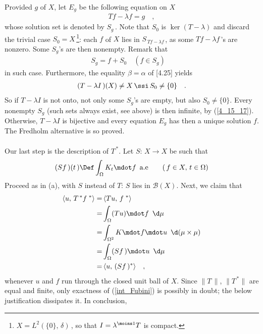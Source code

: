 \\
Provided  $g$ of $X$, let $E_g$ be the following equation on $X$
\begin{align}Tf-\lambda f =g \quad ,\end{align}
whose solution set is denoted by $S_g\,$. Note that $S_0$ is $\ker (T-\lambda)$ and discard the trivial case $S_0=X\,$\footnote{\eg$ X=L^2(\{0\},\, \delta)\,$, so that $I=\lambda^{\moins 1} T $ is compact. }: each $f$ of $X $ lies in $S_{\,Tf-\lambda f\,} $, as some $Tf-\lambda f\,$'s are nonzero. Some $S_g$'s are then nonempty. Remark that 
\begin{align}\label{4_15_17}
S_g= f + S_0 \quad (f\in S_g) \quad 
\end{align}
in such case. Furthermore, the equality $\beta= \alpha $ of [4.25] yields 
\begin{align}
(T-\lambda I\,)(X)\neq X \, \ssi\, S_0 \neq\{0\}  \quad .
\end{align}
So if $T-\lambda I$ is not onto, not only some $S_g$'s are empty, but also $S_0\neq\{0\}$. Every nonempty $S_g$ (such sets always exist, see above) is then infinite, by (\ref{4_15_17}).\\
Otherwise, $T-\lambda I$ is bijective and every equation $E_g$ has then a unique solution $f$. The Fredholm alternative is so proved. \\
\\
Our last step is the description of $T^{\,\ast}$. Let $S:\, X\to X$ be such that
\begin{align}
(Sf\,)(t\,)\Def \int_\Omega K_t \mdot f \,\,\, \text{a.e}\quad \quad (\,f\in X,\, t\in \Omega)
\end{align}
Proceed as in (a), with $S$ instead of $T$: $S$ lies in $\mathscr{B}(X)$. Next, we claim that 
\begin{align}
\langle u,\, T^{\,\ast} f^{\,\,\ast}  \rangle = &\, \langle Tu,\,f^{\,\,\ast}   \rangle\\
=&  \int_{\Omega} (T  u ) \mdot  f \,\, \,\d\mu \\
\label{int_Fubini}=& \int_{\Omega^2} K\mdot f \mdot  u \,\,\, \d(\mu\times\mu) \\
=&  \int_{\Omega} (S  f\, ) \mdot  u \,\,\, \d\mu\,  \\
=&\, \langle u,\, (S f\, )^\ast \rangle \quad ,
\end{align}
whenever $u$ and $f$ run through the closed unit ball of $X$. Since $\|T\, \|$, $\| T^{\,\ast} \|$ are equal and finite, only exactness of (\ref{int_Fubini}) is possibly in doubt; the below justification dissipates it. In conclusion,
